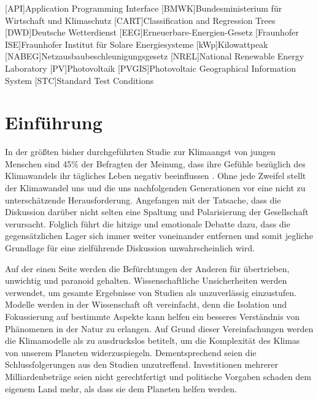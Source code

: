 \documentclass[12pt, a4paper]{article}
\begin{document}
\begin{acronym}
[API]{Application Programming Interface}
[BMWK]{Bundesministerium für Wirtschaft und Klimaschutz}
[CART]{Classification and Regression Trees}
[DWD]{Deutsche Wetterdienst}
[EEG]{Erneuerbare-Energien-Gesetz}
[Fraunhofer ISE]{Fraunhofer Institut für Solare Energiesysteme}
[kWp]{Kilowattpeak}
[NABEG]{Netzausbaubeschleunigungsgesetz}
[NREL]{National Renewable Energy Laboratory}
[PV]{Photovoltaik}
[PVGIS]{Photovoltaic Geographical Information System}
[STC]{Standard Test Conditions}
\end{acronym}

\newpage

\tableofcontents


\newpage
\setcounter{section}{0}


\section{Einführung}


In der größten bisher durchgeführten Studie zur Klimaangst von jungen Menschen sind 45\% der Befragten der Meinung, dass ihre Gefühle bezüglich des Klimawandels ihr tägliches Leben negativ beeinflussen \cite{marks2021young}. Ohne jede Zweifel stellt der Klimawandel uns und die uns nachfolgenden Generationen vor eine nicht zu unterschätzende Herausforderung. Angefangen mit der Tatsache, dass die Diskussion darüber nicht selten eine Spaltung und Polarisierung der Gesellschaft verursacht. Folglich führt die hitzige und emotionale Debatte dazu, dass die gegensätzlichen Lager sich immer weiter voneinander entfernen und somit jegliche Grundlage für eine zielführende Diskussion unwahrscheinlich wird.

Auf der einen Seite werden die Befürchtungen der Anderen für übertrieben, unwichtig und paranoid gehalten. Wissenschaftliche Unsicherheiten werden verwendet, um gesamte Ergebnisse von Studien als unzuverlässig einzustufen. Modelle werden in der Wissenschaft oft vereinfacht, denn die Isolation und Fokussierung auf bestimmte Aspekte kann helfen ein besseres Verständnis von Phänomenen in der Natur zu erlangen. Auf Grund dieser Vereinfachungen werden die Klimamodelle als zu ausdruckslos betitelt, um die Komplexität des Klimas von unserem Planeten widerzuspiegeln. Dementsprechend seien die Schlussfolgerungen aus den Studien unzutreffend. Investitionen mehrerer Milliardenbeträge seien nicht gerechtfertigt und politische Vorgaben schaden dem eigenem Land mehr, als dass sie dem Planeten helfen werden.
\end{document}
